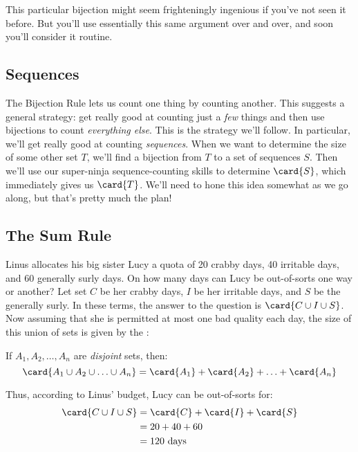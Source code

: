 This particular bijection might seem frighteningly ingenious if you've
not seen it before.  But you'll use essentially this same argument
over and over, and soon you'll consider it routine.

\subsection{Sequences}

The Bijection Rule lets us count one thing by counting another.  This
suggests a general strategy: get really good at counting just a
\textit{few} things and then use bijections to count \textit{everything
else}.  This is the strategy we'll follow.  In particular, we'll get
really good at counting \emph{sequences}.  When we want to determine the
size of some other set $T$, we'll find a bijection from $T$ to a set of
sequences $S$.  Then we'll use our super-ninja sequence-counting skills to
determine $\card{S}$, which immediately gives us $\card{T}$.  We'll need
to hone this idea somewhat as we go along, but that's pretty much the
plan!



\subsection{The Sum Rule}

Linus allocates his big sister Lucy a quota of 20 crabby days, 40
irritable days, and 60 generally surly days.  On how many days can
Lucy be out-of-sorts one way or another?  Let set $C$ be her crabby
days, $I$ be her irritable days, and $S$ be the generally surly.  In
these terms, the answer to the question is $\card{C \cup I \cup S}$.
Now assuming that she is permitted at most one bad quality each day,
the size of this union of sets is given by the :

\begin{mathrule}
If $A_1, A_2, \ldots, A_n$ are \emph{disjoint} sets, then:
%
\[
\card{A_1 \cup A_2 \cup \ldots \cup A_n}
    = \card{A_1} + \card{A_2} + \ldots + \card{A_n}
\]
\end{mathrule}

Thus, according to Linus' budget, Lucy can be out-of-sorts for:
%
\begin{align*}
\card{C \cup I \cup S}
    & = \card{C} + \card{I} + \card{S} \\
    & = 20 + 40 + 60 \\
    & = 120 \text{ days}
\end{align*}

